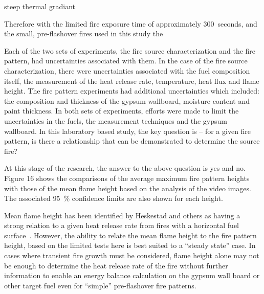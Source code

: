 \documentclass[twoside]{uocthesis}
\begin{document}
{steep thermal gradiant


Therefore with the limited fire exposure time of approximately 300~seconds, and the small, pre-flashover fires used in this study the     



Each of the two sets of experiments, the fire source characterization and the fire pattern, had uncertainties associated with them.  In the case of the fire source characterization, there were uncertainties associated with the fuel composition itself, the measurement of the heat release rate, temperature, heat flux and flame height.  The fire pattern experiments had additional uncertainties which included: the composition and thickness of the gypsum wallboard, moisture content and paint thickness.  In both sets of experiments, efforts were made to limit the uncertainties in the fuels, the measurement techniques and the gypsum wallboard. In this laboratory based study, the key question is – for a given fire pattern, is there a relationship that can be demonstrated to determine the source fire?

At this stage of the research, the answer to the above question is yes and no.  Figure 16 shows the comparisons of the average maximum fire pattern heights with those of the mean flame height based on the analysis of the video images.  The associated 95~\% confidence limits are also shown for each height.  
         
Mean flame height has been identified by Heskestad and others as having a strong relation to a given heat release rate from fires with a horizontal fuel surface~\cite{Heskestad:SFPE, Beyler:1986}.  However, the ability to relate the mean flame height to the fire pattern height, based on the limited tests here is best suited to a “steady state” case.  In cases where transient fire growth must be considered, flame height alone may not be enough to determine the heat release rate of the fire without further information to enable an energy balance calculation on the gypsum wall board or other target fuel even for “simple” pre-flashover fire patterns.

}
\end{document}
